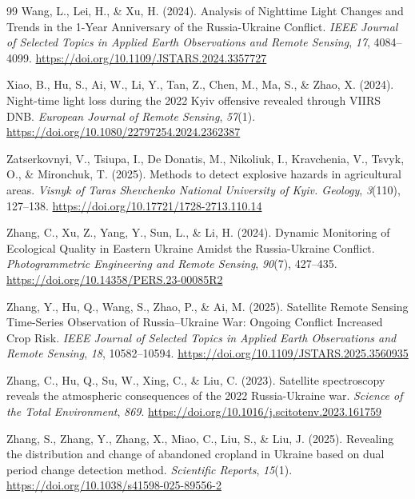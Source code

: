 \documentclass[12pt, a4paper]{article}
\begin{document}
\begin{thebibliography}{99}
Wang, L., Lei, H., \& Xu, H. (2024). Analysis of Nighttime Light Changes and Trends in the 1-Year Anniversary of the Russia-Ukraine Conflict. \textit{IEEE Journal of Selected Topics in Applied Earth Observations and Remote Sensing}, \textit{17}, 4084--4099. \url{https://doi.org/10.1109/JSTARS.2024.3357727}

Xiao, B., Hu, S., Ai, W., Li, Y., Tan, Z., Chen, M., Ma, S., \& Zhao, X. (2024). Night-time light loss during the 2022 Kyiv offensive revealed through VIIRS DNB. \textit{European Journal of Remote Sensing}, \textit{57}(1). \url{https://doi.org/10.1080/22797254.2024.2362387}

Zatserkovnyі, V., Tsiupa, I., De Donatis, M., Nikoliuk, I., Kravchenia, V., Tsvyk, O., \& Mironchuk, T. (2025). Methods to detect explosive hazards in agricultural areas. \textit{Visnyk of Taras Shevchenko National University of Kyiv. Geology}, \textit{3}(110), 127--138. \url{https://doi.org/10.17721/1728-2713.110.14}

Zhang, C., Xu, Z., Yang, Y., Sun, L., \& Li, H. (2024). Dynamic Monitoring of Ecological Quality in Eastern Ukraine Amidst the Russia-Ukraine Conflict. \textit{Photogrammetric Engineering and Remote Sensing}, \textit{90}(7), 427--435. \url{https://doi.org/10.14358/PERS.23-00085R2}

Zhang, Y., Hu, Q., Wang, S., Zhao, P., \& Ai, M. (2025). Satellite Remote Sensing Time-Series Observation of Russia–Ukraine War: Ongoing Conflict Increased Crop Risk. \textit{IEEE Journal of Selected Topics in Applied Earth Observations and Remote Sensing}, \textit{18}, 10582--10594. \url{https://doi.org/10.1109/JSTARS.2025.3560935}

Zhang, C., Hu, Q., Su, W., Xing, C., \& Liu, C. (2023). Satellite spectroscopy reveals the atmospheric consequences of the 2022 Russia-Ukraine war. \textit{Science of the Total Environment}, \textit{869}. \url{https://doi.org/10.1016/j.scitotenv.2023.161759}

Zhang, S., Zhang, Y., Zhang, X., Miao, C., Liu, S., \& Liu, J. (2025). Revealing the distribution and change of abandoned cropland in Ukraine based on dual period change detection method. \textit{Scientific Reports}, \textit{15}(1). \url{https://doi.org/10.1038/s41598-025-89556-2}

\end{thebibliography}
\end{document}
